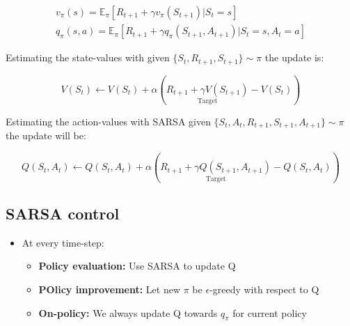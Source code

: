 	\begin{equation}
	\begin{aligned}
		 		v_\pi(s) = \mathbb{E}_\pi[R_{t+1} + \gamma v_\pi(S_{t+1})|S_t =s] \\
		 		q_\pi(s,a) = \mathbb{E}_\pi[R_{t+1}+ \gamma q_\pi(S_{t+1}, A_{t+1}) | S_t = s, A_t = a]
	\end{aligned}
	\end{equation}

Estimating the state-values with given $\{ S_t, R_{t+1},S_{t+1}\} \sim \pi$ the update is:

	\begin{equation}
		V(S_t) \leftarrow V(S_t) + \alpha (\underset{\text{Target}}{R_{t+1}+\gamma V(S_{t+1}) }- V(S_t))  
	\end{equation}  

Estimating the action-values with SARSA given $\{S_t,A_t,R_{t+1},S_{t+1},A_{t+1}\} \sim \pi$ the update will be:

	\begin{equation}
		Q(S_t,A_t) \leftarrow Q(S_t,A_t) + \alpha (\underset{\text{Target}}{R_{t+1} + \gamma Q(S_{t+1},A_{t+1})}-Q(S_t,A_t))
	\end{equation}

\subsection*{SARSA control}

\begin{itemize}
	\item At every time-step:
	\begin{itemize}
	\item \textbf{Policy evaluation: } Use SARSA to update Q
	\item \textbf{POlicy improvement: } Let new $\pi$ be $\epsilon$-greedy with respect to Q
	\item \textbf{On-policy: } We always update Q towards $q_\pi$ for current policy
\end{itemize}
\end{itemize}


